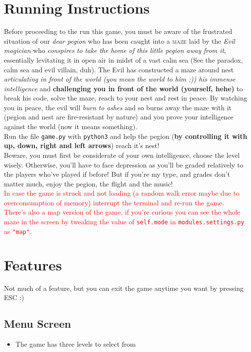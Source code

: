 \documentclass{article}
\begin{document}
\section{Running Instructions}
Before proceeding to the run this game, you must be aware of the frustrated situation of our \textit{dear pegion} who has been caught into a \textsc{maze} laid by the \textit{Evil magician} who \textsl{conspires to take the home of this little pegion away from it}, essentially levitating it in open air in midst of a vast calm sea (See the paradox, calm sea and evil villain, duh). The Evil has constructed a maze around nest \textit{articulating in front of the world (you mean the world to him ;)) his immense intelligence} and \textbf{challenging you in front of the world (yourself, hehe)} to break his code, solve the maze, reach to your nest and rest in peace. By watching you in peace, the evil will \textit{burn to ashes} and so burns away the maze with it (pegion and nest are fire-resistant by nature) and you prove your intelligence against the world (now it means something).\\
Run the file \texttt{game.py} with \texttt{python3} and help the pegion (\textbf{by controlling it with up, down, right and left arrows}) reach it's nest!\\
Beware, you must first be considerate of your own intelligence, choose the level wisely. Otherwise, you'll have to face depression as you'll be graded relatively to the players who've played if before! But if you're my type, and grades don't matter much, enjoy the pegion, the flight and the music!\\
\textcolor{red}{In case the game is struck and not loading (a random walk error maybe due to overconsumption of memory) interrupt the terminal and re-run the game.}\\
\textcolor{red}{There's also a map version of the game, if you're curious you can see the whole maze in the screen by tweaking the value of \texttt{self.mode} in \texttt{modules.settings.py} as \texttt{"map"}.}
\section{Features}
Not much of a feature, but you can exit the game anytime you want by pressing ESC :)\\
\subsection{Menu Screen}
\begin{itemize}
    \item The game has three levels to select from
\end{itemize}
\end{document}
